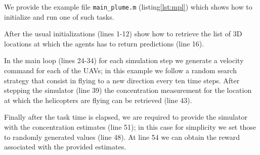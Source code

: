 \documentclass[a4paper,11pt]{report}
\begin{document}
We provide the example file \texttt{main\_plume.m} (listing\ref{lst:mpl}) which shows how to initialize and run one of such tasks.

After the usual initializations (lines 1-12) show how to retrieve the list of 3D locations at which the agents has to return predictions (line 16). 

In the main loop (lines 24-34) for each simulation step we generate a velocity command for each of the UAVs; in this example we follow a random search strategy that consist in flying to a new direction every ten time steps. After stepping the simulator (line 39) the concentration measurement for the location at which the helicopters are flying can be retrieved (line 43).

Finally after the task time is elapsed, we are required to provide the simulator with the concentration estimates (line 51); in this case for simplicity we set those to randomly generated values (line 48). At line 54 we can obtain the reward associated with the provided estimates.
\end{document}
